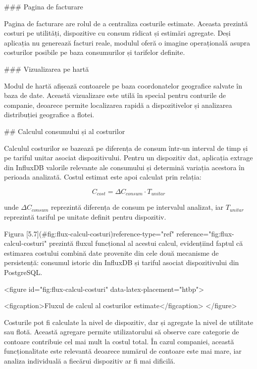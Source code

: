 ### Pagina de facturare

Pagina de facturare are rolul de a centraliza costurile estimate.
Aceasta prezintă costuri pe utilități, dispozitive cu consum ridicat și
estimări agregate. Deși aplicația nu generează facturi reale, modulul
oferă o imagine operațională asupra costurilor posibile pe baza
consumurilor și tarifelor definite.

### Vizualizarea pe hartă

Modul de hartă afișează contoarele pe baza coordonatelor geografice
salvate în baza de date. Această vizualizare este utilă în special
pentru conturile de companie, deoarece permite localizarea rapidă a
dispozitivelor și analizarea distribuției geografice a flotei.

## Calculul consumului și al costurilor

Calculul costurilor se bazează pe diferența de consum într-un interval
de timp și pe tariful unitar asociat dispozitivului. Pentru un
dispozitiv dat, aplicația extrage din InfluxDB valorile relevante ale
consumului și determină variația acestora în perioada analizată. Costul
estimat este apoi calculat prin relația:

$$\begin{equation}
C_{cost} = \Delta C_{consum} \cdot T_{unitar}
\label{eq:calcul-cost}
\end{equation}$$

unde $\Delta C_{consum}$ reprezintă diferența de consum pe intervalul
analizat, iar $T_{unitar}$ reprezintă tariful pe unitate definit pentru
dispozitiv.

Figura [5.7](#fig:flux-calcul-costuri){reference-type="ref"
reference="fig:flux-calcul-costuri"} prezintă fluxul funcțional al
acestui calcul, evidențiind faptul că estimarea costului combină date
provenite din cele două mecanisme de persistență: consumul istoric din
InfluxDB și tariful asociat dispozitivului din PostgreSQL.

<figure id="fig:flux-calcul-costuri" data-latex-placement="htbp">

<figcaption>Fluxul de calcul al costurilor estimate</figcaption>
</figure>

Costurile pot fi calculate la nivel de dispozitiv, dar și agregate la
nivel de utilitate sau flotă. Această agregare permite utilizatorului să
observe care categorie de contoare contribuie cel mai mult la costul
total. În cazul companiei, această funcționalitate este relevantă
deoarece numărul de contoare este mai mare, iar analiza individuală a
fiecărui dispozitiv ar fi mai dificilă.

